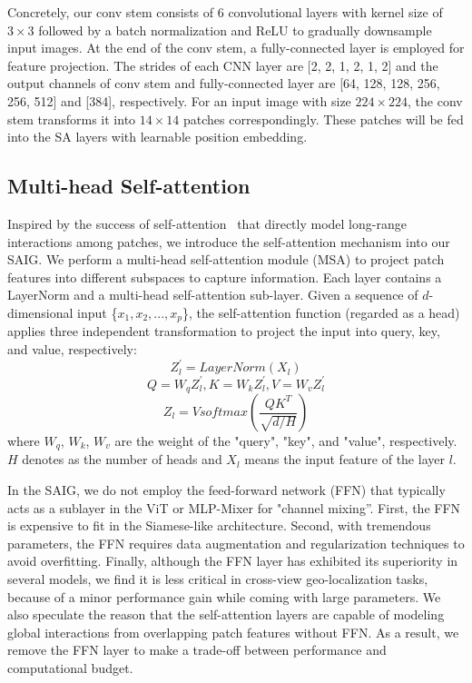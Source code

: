 \documentclass[sn-basic,iicol]{sn-jnl}
\theoremstyle{thmstyletwo}\newtheorem{example}{Example}\newtheorem{remark}{Remark}
\theoremstyle{thmstylethree}\newtheorem{definition}{Definition}
\begin{document}
Concretely, our conv stem consists of 6 convolutional layers with kernel size of $3\times3$ followed by a batch normalization and ReLU to gradually downsample input images. At the end of the conv stem, a fully-connected layer is employed for feature projection. The strides of each CNN layer are [2, 2, 1, 2, 1, 2] and the output channels of conv stem and fully-connected layer are [64, 128, 128, 256, 256, 512] and [384], respectively. For an input image with size ${224 \times 224}$, the conv stem transforms it into $14\times14$ patches correspondingly. These patches will be fed into the SA layers with learnable position embedding.

\subsection{Multi-head Self-attention}\label{MSA}

Inspired by the success of self-attention~\citep{Transformer2017} that directly model long-range interactions among patches, we introduce the self-attention mechanism into our SAIG. We perform a multi-head self-attention module (MSA) to project patch features into different subspaces to capture information. Each layer contains a LayerNorm and a multi-head self-attention sub-layer. Given a sequence of $d$-dimensional input \{${x_1,x_2,...,x_p}$\}, the self-attention function (regarded as a head) applies three independent transformation to project the input into query, key, and value, respectively:
\begin{equation}
Z^{'}_{l} = LayerNorm(X_{l})\label{LN}
\end{equation}
\begin{equation}
Q = W_qZ^{'}_{l}, K = W_kZ^{'}_{l}, V=W_vZ^{'}_{l}\label{qkv}
\end{equation}
\begin{equation}
Z_l = Vsoftmax(\frac{QK^T}{\sqrt{d/H}})\label{score}
\end{equation}
where $W_q$, $W_k$, $W_v$ are the weight of the "query", "key", and "value", respectively. $H$ denotes as the number of heads and $X_{l}$ means the input feature of the layer $l$. 

In the SAIG, we do not employ the feed-forward network (FFN) that typically acts as a sublayer in the ViT or MLP-Mixer for "channel mixing”. First, the FFN is expensive to fit in the Siamese-like architecture. Second, with tremendous parameters, the FFN requires data augmentation and regularization techniques to avoid overfitting. Finally, although the FFN layer has exhibited its superiority in several models, we find it is less critical in cross-view geo-localization tasks, because of a minor performance gain while coming with large parameters. We also speculate the reason that the self-attention layers are capable of modeling global interactions from overlapping patch features without FFN. As a result, we remove the FFN layer to make a trade-off between performance and computational budget.
\end{document}
